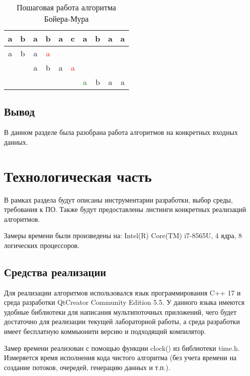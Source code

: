 \documentclass[a4paper,12pt]{report}
\begin{document}
			\begin{longtable}{| c | c | c | c | c | c | c | c | c | c | }
				\caption{Пошаговая работа алгоритма Бойера-Мура}
				\label{table:bm}\\
				\hline
				a&b&a&b&a&c&a&b&a&a \\
				\hline
				\hline
				a&b&a&\textcolor{red}{a}&&&&&&\\
				\hline
				&&a&b&a&\textcolor{red}{a}&&&&\\
				\hline
				&&&&&&\textcolor{green}{a}&b&a&a\\
				\hline
			\end{longtable}
	
	\section{Вывод}

		В данном разделе была разобрана работа алгоритмов на конкретных входных данных.

    \newpage

    \chapter{Технологическая часть}
    
        \label{sec:tecnologic_part}
			В рамках раздела будут описаны инструментарии разработки, выбор среды, требования к ПО. 
			Также будут предоставлены листинги конкретных реализаций алгоритмов.
			
			Замеры времени были произведены на: Intel(R) Core(TM) i7-8565U, 4 ядра, 8 логических процессоров.
	
	\section{Средства реализации}
			
			Для реализации алгоритмов использовался язык программирования C++ 17 и среда разработки QtCreator Community Edition 5.5. 
        	У данного языка имеются удобные библиотеки для написания мультипоточных приложений, чего будет достаточно для реализации текущей лабораторной работы, а среда разработки имеет бесплатную коммьюнити версию и подходящий компилятор.
        	
        	Замер времени реализован с помощью функции clock() из библиотеки time.h.
        	Измеряется время исполнения кода чистого алгоритма (без учета времени на создание потоков, очередей, генерацию данных и т.п.).
\end{document}
